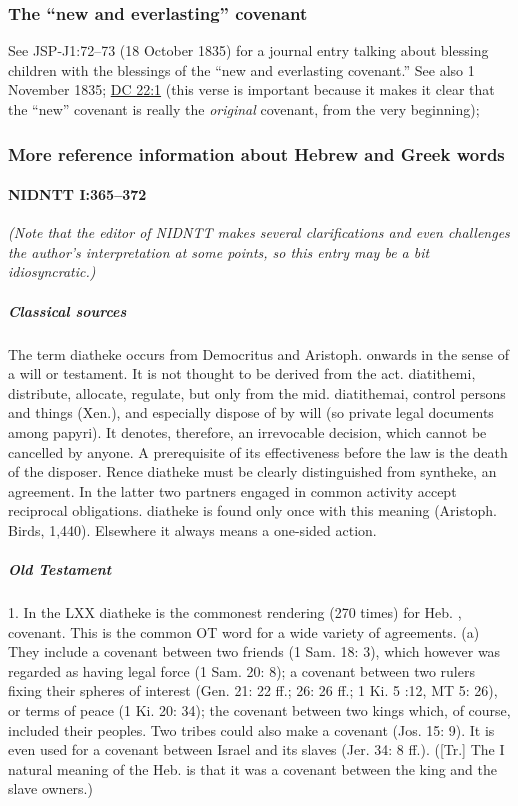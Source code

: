 	\subsubsection{The ``new and everlasting'' covenant}
		\label{COVENANT-everlasting}
		
		See JSP-J1:72--73 (18 October 1835) for a journal entry talking about blessing children with the blessings of the ``new and everlasting covenant.'' See also 1 November 1835; \hyperref[DC22-1]{DC 22:1} (this verse is important because it makes it clear that the ``new'' covenant is really the \textit{original} covenant, from the very beginning); 
		
	\subsubsection{More reference information about Hebrew and Greek words}
		\label{COVENANT-reference}
		
		\paragraph{NIDNTT I:365--372}
			\label{COVENANT-NIDNTT}
		
			\textit{(Note that the editor of NIDNTT makes several clarifications and even challenges the author's interpretation at some points, so this entry may be a bit idiosyncratic.)}
		
			\subparagraph{Classical sources}
			
				The term diatheke occurs from Democritus and Aristoph. onwards in the sense of a will or testament. It is not thought to be derived from the act. diatithemi, distribute, allocate, regulate, but only from the mid. diatithemai, control persons and things (Xen.), and especially dispose of by will (so private legal documents among papyri). It denotes, therefore, an irrevocable decision, which cannot be cancelled by anyone. A prerequisite of its effectiveness before the law is the death of the disposer. Rence diatheke must be clearly distinguished from syntheke, an agreement. In the latter two partners engaged in common activity accept reciprocal obligations. diatheke is found only once with this meaning (Aristoph. Birds, 1,440). Elsewhere it always means a one-sided action. 

			\subparagraph{Old Testament}
			
				1. In the LXX diatheke is the commonest rendering (270 times) for Heb. , covenant. This is the common OT word for a wide variety of agreements. (a) They include a covenant between two friends (1 Sam. 18: 3), which however was regarded as having legal force (1 Sam. 20: 8); a covenant between two rulers fixing their spheres of interest (Gen. 21: 22 ff.; 26: 26 ff.; 1 Ki. 5 :12, MT 5: 26), or terms of peace (1 Ki. 20: 34); the covenant between two kings which, of course, included their peoples. Two tribes could also make a covenant (Jos. 15: 9). It is even used for a covenant between Israel and its slaves (Jer. 34: 8 ff.). ([Tr.] The I natural meaning of the Heb. is that it was a covenant between the king and the slave owners.) 

